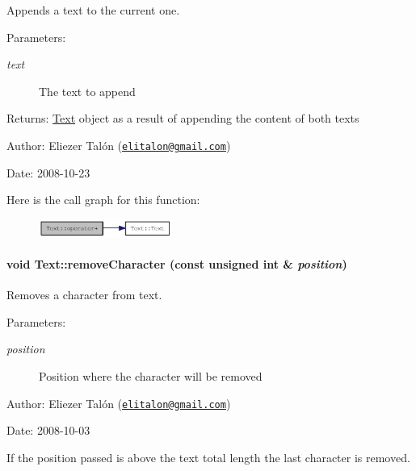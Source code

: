 Appends a text to the current one. 

\begin{Desc}
\item[Parameters:]
\begin{description}
\item[{\em text}]The text to append\end{description}
\end{Desc}
\begin{Desc}
\item[Returns:]\hyperlink{class_text}{Text} object as a result of appending the content of both texts\end{Desc}
\begin{Desc}
\item[Author:]Eliezer Talón (\href{mailto:elitalon@gmail.com}{\tt elitalon@gmail.com}) \end{Desc}
\begin{Desc}
\item[Date:]2008-10-23 \end{Desc}


Here is the call graph for this function:\nopagebreak
\begin{figure}[H]
\begin{center}
\leavevmode
\includegraphics[width=124pt]{class_text_c8887fb224e0402448ede4f3b9f7452d_cgraph}
\end{center}
\end{figure}
\hypertarget{class_text_e04500eeada2a4a3bb00554b32263c52}{
\paragraph[{removeCharacter}]{\setlength{\rightskip}{0pt plus 5cm}void Text::removeCharacter (const unsigned int \& {\em position})}\hfill}
\label{class_text_e04500eeada2a4a3bb00554b32263c52}


Removes a character from text. 

\begin{Desc}
\item[Parameters:]
\begin{description}
\item[{\em position}]Position where the character will be removed\end{description}
\end{Desc}
\begin{Desc}
\item[Author:]Eliezer Talón (\href{mailto:elitalon@gmail.com}{\tt elitalon@gmail.com}) \end{Desc}
\begin{Desc}
\item[Date:]2008-10-03\end{Desc}
If the position passed is above the text total length the last character is removed. 

